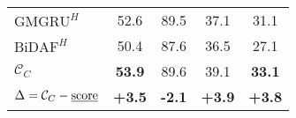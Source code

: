 \begin{table}[!h]
\begin{center}
{\begin{tabular}{lcccc}
$\text{GMGRU}^{H}$                             & 52.6                 & 89.5                   & 37.1                 & 31.1                 \\
$\text{BiDAF}^{H}$                             & 50.4                 & 87.6                   & 36.5                 & 27.1                 \\ \midrule
  $\mathcal{C}_{C}$                            & {\bf 53.9}           & 89.6                   & 39.1                 & {\bf 33.1}           \\
$\Delta=\mathcal{C}_{C} - \text{\underline{score}}$ & {\bf +3.5} & {\bf -2.1}   & {\bf +3.9} & {\bf +3.8} \\ \hline
  \bottomrule
\end{tabular}}
\end{center}
\end{table}

